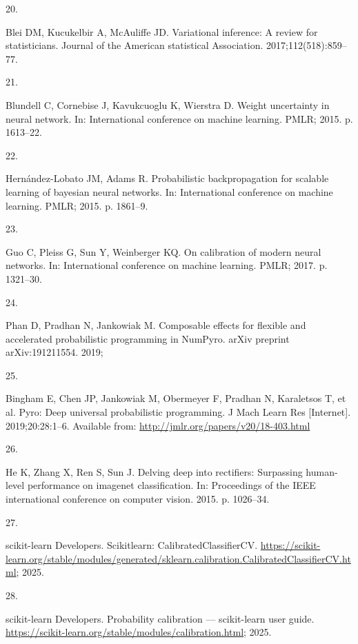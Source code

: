 \documentclass[
  a4paper,
]{scrreprt}
\newlength{\cslhangindent}
\newlength{\csllabelwidth}
\newenvironment{CSLReferences}[2] %
 {\begin{list}{}{%
  \setlength{\itemindent}{0pt}
  \setlength{\leftmargin}{0pt}
  \setlength{\parsep}{0pt}
  \ifodd #1
   \setlength{\leftmargin}{\cslhangindent}
   \setlength{\itemindent}{-1\cslhangindent}
  \fi
  \setlength{\itemsep}{#2\baselineskip}}}
 {\end{list}}
\newcommand{\CSLLeftMargin}[1]{\parbox[t]{\csllabelwidth}{\strut#1\strut}}
\newcommand{\CSLRightInline}[1]{\parbox[t]{\linewidth - \csllabelwidth}{\strut#1\strut}}
\begin{document}
\begin{CSLReferences}{0}{1}
\CSLLeftMargin{20. }%
\CSLRightInline{Blei DM, Kucukelbir A, McAuliffe JD. Variational
inference: A review for statisticians. Journal of the American
statistical Association. 2017;112(518):859--77. }

\CSLLeftMargin{21. }%
\CSLRightInline{Blundell C, Cornebise J, Kavukcuoglu K, Wierstra D.
Weight uncertainty in neural network. In: International conference on
machine learning. PMLR; 2015. p. 1613--22. }

\CSLLeftMargin{22. }%
\CSLRightInline{Hernández-Lobato JM, Adams R. Probabilistic
backpropagation for scalable learning of bayesian neural networks. In:
International conference on machine learning. PMLR; 2015. p. 1861--9. }

\CSLLeftMargin{23. }%
\CSLRightInline{Guo C, Pleiss G, Sun Y, Weinberger KQ. On calibration of
modern neural networks. In: International conference on machine
learning. PMLR; 2017. p. 1321--30. }

\CSLLeftMargin{24. }%
\CSLRightInline{Phan D, Pradhan N, Jankowiak M. Composable effects for
flexible and accelerated probabilistic programming in NumPyro. arXiv
preprint arXiv:191211554. 2019; }

\CSLLeftMargin{25. }%
\CSLRightInline{Bingham E, Chen JP, Jankowiak M, Obermeyer F, Pradhan N,
Karaletsos T, et al. Pyro: Deep universal probabilistic programming. J
Mach Learn Res {[}Internet{]}. 2019;20:28:1--6. Available from:
\url{http://jmlr.org/papers/v20/18-403.html}}

\CSLLeftMargin{26. }%
\CSLRightInline{He K, Zhang X, Ren S, Sun J. Delving deep into
rectifiers: Surpassing human-level performance on imagenet
classification. In: Proceedings of the IEEE international conference on
computer vision. 2015. p. 1026--34. }

\CSLLeftMargin{27. }%
\CSLRightInline{scikit-learn Developers. Scikit\-learn:
CalibratedClassifierCV.
\url{https://scikit-learn.org/stable/modules/generated/sklearn.calibration.CalibratedClassifierCV.html};
2025. }

\CSLLeftMargin{28. }%
\CSLRightInline{scikit-learn Developers. Probability calibration ---
scikit-learn user guide.
\url{https://scikit-learn.org/stable/modules/calibration.html}; 2025. }

\end{CSLReferences}
\end{document}
